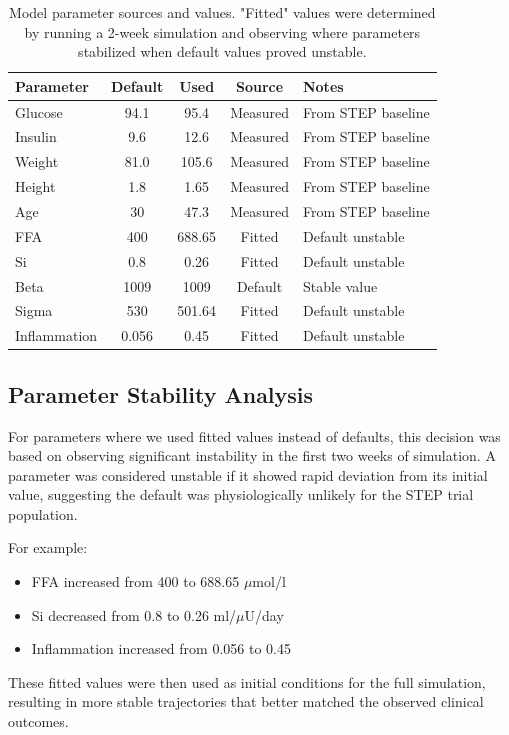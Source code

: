 \begin{table}[h]
\centering
\begin{tabular}{|l|c|c|c|l|}
\hline
\textbf{Parameter} & \textbf{Default} & \textbf{Used} & \textbf{Source} & \textbf{Notes} \\
\hline
Glucose & 94.1 & 95.4 & Measured & From STEP baseline \\
Insulin & 9.6 & 12.6 & Measured & From STEP baseline \\
Weight & 81.0 & 105.6 & Measured & From STEP baseline \\
Height & 1.8 & 1.65 & Measured & From STEP baseline \\
Age & 30 & 47.3 & Measured & From STEP baseline \\
\hline
FFA & 400 & 688.65 & Fitted & Default unstable \\
Si & 0.8 & 0.26 & Fitted & Default unstable \\
Beta & 1009 & 1009 & Default & Stable value \\
Sigma & 530 & 501.64 & Fitted & Default unstable \\
Inflammation & 0.056 & 0.45 & Fitted & Default unstable \\
\hline
\end{tabular}
\caption{Model parameter sources and values. "Fitted" values were determined by running a 2-week simulation and observing where parameters stabilized when default values proved unstable.}
\end{table}

\subsection{Parameter Stability Analysis}
For parameters where we used fitted values instead of defaults, this decision was based on observing significant instability in the first two weeks of simulation. A parameter was considered unstable if it showed rapid deviation from its initial value, suggesting the default was physiologically unlikely for the STEP trial population.

For example:
\begin{itemize}
    \item FFA increased from 400 to 688.65 $\mu$mol/l
    \item Si decreased from 0.8 to 0.26 ml/$\mu$U/day
    \item Inflammation increased from 0.056 to 0.45
\end{itemize}

These fitted values were then used as initial conditions for the full simulation, resulting in more stable trajectories that better matched the observed clinical outcomes.

